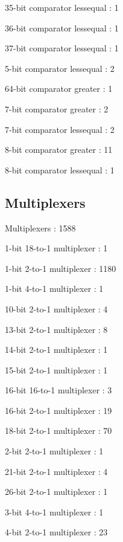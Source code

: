 \documentclass[letterpaper, 11 pt, conference]{article}
\begin{document}
 35-bit comparator lessequal                           : 1

 36-bit comparator lessequal                           : 1

 37-bit comparator lessequal                           : 1

 5-bit comparator lessequal                            : 2

 64-bit comparator greater                             : 1

 7-bit comparator greater                              : 2

 7-bit comparator lessequal                            : 2

 8-bit comparator greater                              : 11

 8-bit comparator lessequal                            : 1

\subsection{ Multiplexers}
Multiplexers                                         : 1588

 1-bit 18-to-1 multiplexer                             : 1

 1-bit 2-to-1 multiplexer                              : 1180

 1-bit 4-to-1 multiplexer                              : 1

 10-bit 2-to-1 multiplexer                             : 4

 13-bit 2-to-1 multiplexer                             : 8

 14-bit 2-to-1 multiplexer                             : 1

 15-bit 2-to-1 multiplexer                             : 1

 16-bit 16-to-1 multiplexer                            : 3

 16-bit 2-to-1 multiplexer                             : 19

 18-bit 2-to-1 multiplexer                             : 70

 2-bit 2-to-1 multiplexer                              : 1

 21-bit 2-to-1 multiplexer                             : 4

 26-bit 2-to-1 multiplexer                             : 1

 3-bit 4-to-1 multiplexer                              : 1

 4-bit 2-to-1 multiplexer                              : 23
\end{document}
